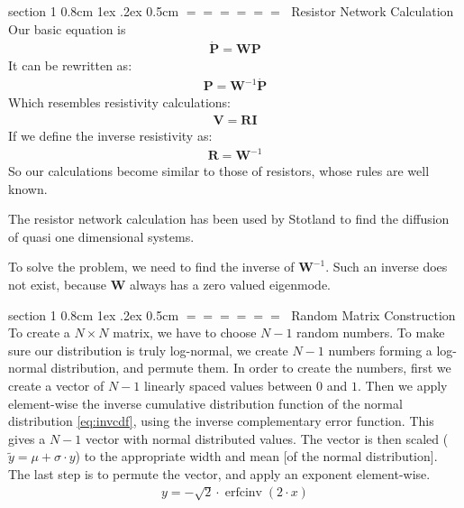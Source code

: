 \documentclass[onecolumn,fleqn,notitlepage,secnumarabic]{revtex4}
\makeatletter
\def\section{%
  \@startsection
    {section}%
    {1}%
    {\z@}%
    {0.8cm \@plus1ex \@minus .2ex}%
    {0.5cm}%
    {\Large\bf $=\!=\!=\!=\!=\!=\;$}%
}%
\makeatother
\begin{document}
\section{Resistor Network Calculation} \label{sec:res_net}
Our basic equation is 
\begin{align} \boldsymbol{ \dot P } = \boldsymbol{W} \boldsymbol{P} \end{align}
It can be rewritten as:
\begin{align}  \boldsymbol{P} = \boldsymbol{W}^{-1}\boldsymbol{ \dot P } \end{align}
Which resembles resistivity calculations:
\begin{align} \boldsymbol{V} = \boldsymbol{R}\boldsymbol{ I } \end{align}
If we define the inverse resistivity as:
\begin{align} \boldsymbol{R} = \boldsymbol{W}^{-1} \end{align}
So our calculations become similar to those of resistors, whose rules are well known.

The resistor network calculation has been used by Stotland to find the diffusion of quasi one dimensional systems.

To solve the problem, we need to find the inverse of $\boldsymbol{W}^{-1}$. Such an inverse does not exist, because $\boldsymbol{W}$ always has a zero valued eigenmode.

\section{Random Matrix Construction}\label{sec:matrix_construction}
To create a $N\times N$ matrix, we have to choose $N-1$ random numbers. To make sure our distribution is truly log-normal, we create $N-1$ numbers forming a log-normal distribution, and permute them. In order to create the numbers, first we create a vector of $N-1$ linearly spaced values between $0$ and $1$. Then we apply element-wise the inverse cumulative distribution function of the normal distribution \ref{eq:invcdf}, using the inverse complementary error function. This gives a $N-1$ vector with normal distributed values. The vector is then scaled ($\tilde{y} = \mu+\sigma\cdot y$) to the appropriate width and mean [of the normal distribution]. The last step is to permute the vector, and apply an exponent element-wise.
\begin{align}\label{eq:invcdf}
y = -\sqrt{2}\cdot\operatorname{erfcinv}(2\cdot x) 
\end{align}
\end{document}
